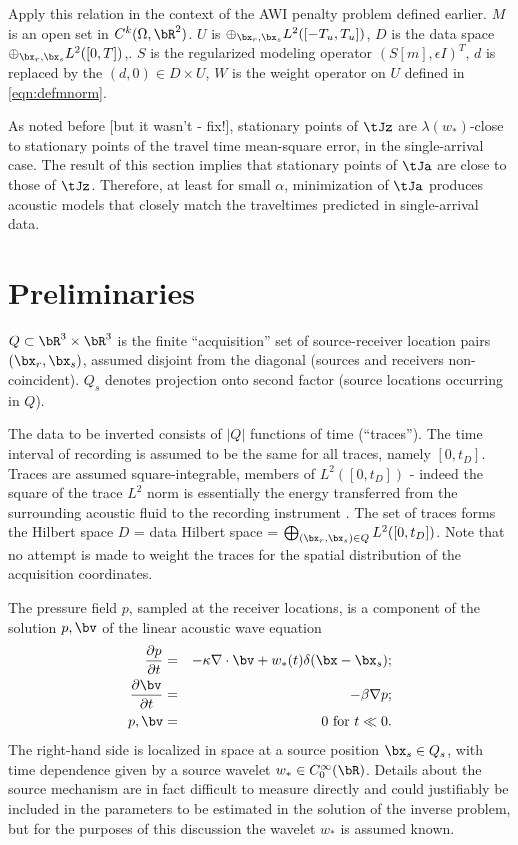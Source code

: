 Apply this relation in the context of the AWI penalty problem defined earlier. $M$ is an open set in $C^k(\Omega, \bR^2)$. $U$ is $\oplus_{\bx_r,\bx_s}L^2([-T_u,T_u])$, $D$ is the data space $\oplus_{\bx_r,\bx_s}L^2([0,T])$,. $S$ is the regularized modeling operator $(S[m],\epsilon I)^T$, $d$ is replaced by the $(d,0) \in D \times U$,  $W$ is the weight operator on $U$ defined in \ref{eqn:defmnorm}.

As noted before [but it wasn't - fix!], stationary points of $\tJz$
are $\lambda(w_*)$-close to stationary points of the travel time
mean-square error, in the single-arrival case. The result of this
section implies that stationary points of $\tJa$ are close to those of
$\tJz$. Therefore, at least for small $\alpha$, minimization of $\tJa$
produces acoustic models that closely match the traveltimes predicted
in single-arrival data.



\section{Preliminaries}


$Q \subset \bR^3 \times \bR^3$ is the finite ``acquisition'' set of source-receiver location pairs $(\bx_r,\bx_s)$, assumed disjoint from the diagonal (sources and receivers non-coincident). $Q_s$ denotes projection onto second factor (source locations occurring in $Q$).


The data to be inverted consists of $|Q|$ functions of time (``traces''). The time interval of recording is assumed to be the same for all traces, namely $[0,t_D]$. Traces are assumed square-integrable, members of $ L^2([0,t_D])$ - indeed the square of the trace $L^2$ norm is essentially the energy transferred from the surrounding acoustic fluid to the recording instrument \cite[]{SantosaSymes:00}. The set of traces forms the Hilbert space $D$ = data Hilbert space = $\bigoplus_{(\bx_r,\bx_s) \in Q} L^2([0,t_D])$. Note that no attempt is made to weight the traces for the spatial distribution of the acquisition coordinates.

The pressure field $p$, sampled at the receiver locations, is a component of the solution ${p,\bv}$ of the linear acoustic wave equation
\begin{eqnarray}
  \label{eqn:awe}
  \frac{\partial p}{\partial t} & = & - \kappa \nabla \cdot \bv +
                                      w_*(t) \delta(\bx-\bx_s); \\
  \frac{\partial \bv}{\partial t} & = & - \beta \nabla p; \\
  p, \bv & = & 0 \mbox{ for }  t \ll 0.
\end{eqnarray}
The right-hand side is localized in space at a source position $\bx_s \in Q_s$, with time dependence given by a {source wavelet} $w_* \in C_0^{\infty}(\bR)$. Details about the source mechanism are in fact difficult to measure directly and could justifiably be included in the parameters to be estimated in the solution of the inverse problem, but for the purposes of this discussion the wavelet $w_*$ is assumed known.

